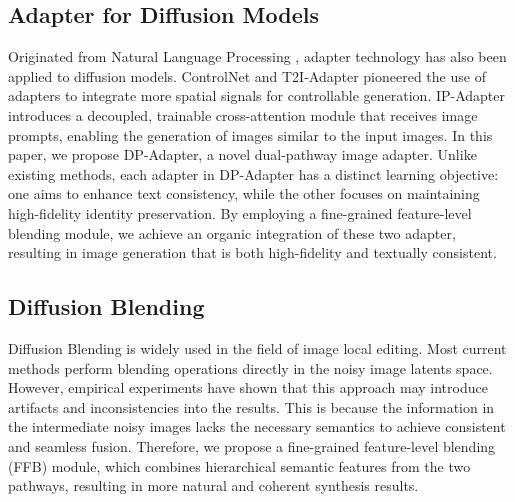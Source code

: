 \subsection{Adapter for Diffusion Models}
Originated from Natural Language Processing \cite{houlsby2019parameter}, adapter technology has also been applied to diffusion models. ControlNet \cite{zhang2023adding} and T2I-Adapter \cite{mou2024t2i} pioneered the use of adapters to integrate more spatial signals for controllable generation. IP-Adapter \cite{ye2023ip} introduces a decoupled, trainable cross-attention module that receives image prompts, enabling the generation of images similar to the input images. 
In this paper, we propose DP-Adapter, a novel dual-pathway image adapter. Unlike existing methods, each adapter in DP-Adapter has a distinct learning objective: one aims to enhance text consistency, while the other focuses on maintaining high-fidelity identity preservation. By employing a fine-grained feature-level blending module, we achieve an organic integration of these two adapter, resulting in image generation that is both high-fidelity and textually consistent.



\subsection{Diffusion Blending}

Diffusion Blending is widely used in the field of image local editing. Most current methods \cite{lugmayr2022repaint, avrahami2023blended, avrahami2022blended,couairon2022diffedit,zhao2023magicfusion} perform blending operations directly in the noisy image latents space. However, empirical experiments have shown that this approach may introduce artifacts and inconsistencies into the results. This is because the information in the intermediate noisy images lacks the necessary semantics to achieve consistent and seamless fusion. Therefore, we propose a fine-grained feature-level blending (FFB) module, which combines hierarchical semantic features from the two pathways, resulting in more natural and coherent synthesis results.

